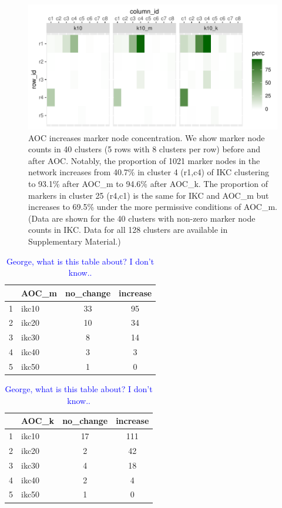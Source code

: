 \documentclass[12pt, oneside]{article}   	%
\begin{document}
\begin{figure}[H]
	\centering
	 \includegraphics[width=0.7\linewidth]{marker_comps_wide.pdf} 
\caption{AOC increases marker node concentration. We show marker node counts in 40 clusters (5 rows with 8 clusters per row) before and after AOC.  Notably, the proportion of 1021 marker nodes in the network increases from 40.7\% in cluster 4 (r1,c4) of IKC clustering to 93.1\% after AOC\_m to 94.6\% after AOC\_k. The proportion of markers in cluster 25 (r4,c1) is the same for IKC and AOC\_m but increases to  69.5\% under the more permissive conditions of AOC\_m. (Data are shown for the 40 clusters with non-zero marker node counts in IKC. Data for all 128 clusters are available in Supplementary Material.)}
\label{fig:marker-node-concentration}
\end{figure}

\clearpage
\begin{table}[H]
\centering
\begin{tabular}{rlcc}
  \hline
 & AOC\_m & no\_change & increase \\ 
  \hline
1 & ikc10 &  33 &  95 \\ 
2 & ikc20 &  10 &  34 \\ 
3 & ikc30 &   8 &  14 \\ 
4 & ikc40 &   3 &   3 \\ 
5 & ikc50 &   1 &   0 \\ 
   \hline
\end{tabular}
\quad
\begin{tabular}{rlcc}
  \hline
 & AOC\_k& no\_change & increase \\ 
  \hline
1 & ikc10 &  17 & 111 \\ 
2 & ikc20 &   2 &  42 \\ 
3 & ikc30 &   4 &  18 \\ 
4 & ikc40 &   2 &   4 \\ 
5 & ikc50 &   1 &   0 \\ 
   \hline
\end{tabular}
\caption{\textcolor{blue}{George, what is this table about? I don't know..}}
\label{tab:tab-unknown}
\end{table}
\end{document}
